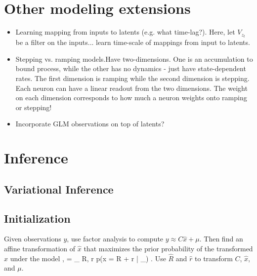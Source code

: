\documentclass{article}
\DeclareMathOperator*{\argmax}{arg\,max}
\begin{document}
\section{Other modeling extensions}
\begin{itemize}
\item Learning mapping from inputs to latents (e.g. what time-lag?). Here, let $V_{z_t}$ be a filter on the inputs... learn time-scale of mappings from input to latents. 
\item Stepping vs. ramping models.Have two-dimensions. One is an accumulation to bound process, while the other has no dynamics - just have state-dependent rates. The first dimension is ramping while the second dimension is stepping. Each neuron can have a linear readout from the two dimensions. The weight on each dimension corresponds to how much a neuron weights onto ramping or stepping! 
\item Incorporate GLM observations on top of latents? 
\end{itemize}

\section{Inference}

\subsection{Variational Inference}

\subsection{Initialization}
Given observations $y$, use factor analysis to compute $y \approx C \hat{x} + \mu$. Then find an affine transformation of $\hat{x}$ that maximizes the prior probability of the transformed $\hat{x}$ under the model 
\be
{},  = \argmax_{ R, r } \log p(x = R  + r | \theta_) .
\ee
Use $\hat{R}$ and $\hat{r}$ to transform $C$, $\hat{x}$, and $\mu$.
\end{document}
